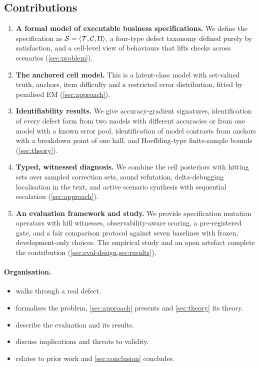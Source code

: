 \subsection{Contributions}

\begin{enumerate}[leftmargin=*,label=\textbf{C\arabic*.}]
\item \textbf{A formal model of executable business specifications.} We define the specification as $\mathcal{S}=\langle\mathcal{T},\mathcal{C},\Pi\rangle$, a four-type defect taxonomy defined purely by satisfaction, and a cell-level view of behaviours that lifts checks across scenarios (\cref{sec:problem}).
\item \textbf{The anchored cell model.} This is a latent-class model with set-valued truth, anchors, item difficulty and a restricted error distribution, fitted by penalised EM (\cref{sec:approach}).
\item \textbf{Identifiability results.} We give accuracy-gradient signatures, identification of every defect form from two models with different accuracies or from one model with a known error pool, identification of model contrasts from anchors with a breakdown point of one half, and Hoeffding-type finite-sample bounds (\cref{sec:theory}).
\item \textbf{Typed, witnessed diagnosis.} We combine the cell posteriors with hitting sets over sampled correction sets, sound refutation, delta-debugging localisation in the text, and active scenario synthesis with sequential escalation (\cref{sec:approach}).
\item \textbf{An evaluation framework and study.} We provide specification mutation operators with kill witnesses, observability-aware scoring, a pre-registered gate, and a fair comparison protocol against seven baselines with frozen, development-only choices. The empirical study and an open artefact complete the contribution (\cref{sec:eval-design,sec:results}).
\end{enumerate}

\paragraph{Organisation.}
\begin{itemize}[leftmargin=*]
\item {} walks through a real defect.
\item {} formalises the problem, \cref{sec:approach} presents \specdx and \cref{sec:theory} its theory.
\item {} describe the evaluation and its results.
\item {} discuss implications and threats to validity.
\item {} relates \specdx to prior work and \cref{sec:conclusion} concludes.
\end{itemize}
